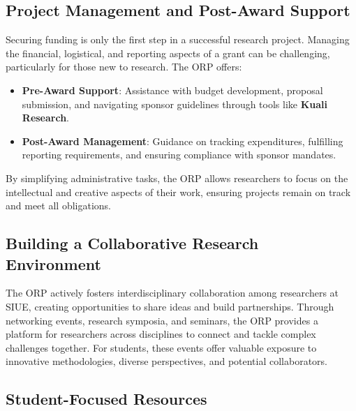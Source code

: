 \documentclass[
]{book}
\providecommand{\tightlist}{%
  \setlength{\itemsep}{0pt}\setlength{\parskip}{0pt}}
\begin{document}
\subsection*{Project Management and Post-Award Support}\label{project-management-and-post-award-support}

Securing funding is only the first step in a successful research project. Managing the financial, logistical, and reporting aspects of a grant can be challenging, particularly for those new to research. The ORP offers:

\begin{itemize}
\tightlist
\item
  \textbf{Pre-Award Support}: Assistance with budget development, proposal submission, and navigating sponsor guidelines through tools like \textbf{Kuali Research}.
\item
  \textbf{Post-Award Management}: Guidance on tracking expenditures, fulfilling reporting requirements, and ensuring compliance with sponsor mandates.
\end{itemize}

By simplifying administrative tasks, the ORP allows researchers to focus on the intellectual and creative aspects of their work, ensuring projects remain on track and meet all obligations.

\subsection*{Building a Collaborative Research Environment}\label{building-a-collaborative-research-environment}

The ORP actively fosters interdisciplinary collaboration among researchers at SIUE, creating opportunities to share ideas and build partnerships. Through networking events, research symposia, and seminars, the ORP provides a platform for researchers across disciplines to connect and tackle complex challenges together. For students, these events offer valuable exposure to innovative methodologies, diverse perspectives, and potential collaborators.

\subsection*{Student-Focused Resources}\label{student-focused-resources}
\end{document}
